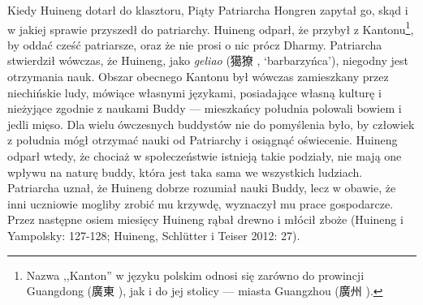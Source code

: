 Kiedy Huineng dotarł do klasztoru, Piąty Patriarcha Hongren zapytał go, skąd i w jakiej sprawie przyszedł do patriarchy.
Huineng odparł, że przybył z Kantonu\footnote{Nazwa ,,Kanton'' w języku polskim odnosi się zarówno do prowincji Guangdong (廣東 ), jak i do jej stolicy --- miasta Guangzhou (廣州 ).}, by oddać cześć patriarsze, oraz że nie prosi o nic prócz Dharmy.
Patriarcha stwierdził wówczas, że Huineng, jako \textit{geliao} (獦獠 , `barbarzyńca'), niegodny jest otrzymania nauk.
Obszar obecnego Kantonu był wówczas zamieszkany przez niechińskie ludy, mówiące własnymi językami, posiadające własną kulturę i nieżyjące zgodnie z naukami Buddy --- mieszkańcy południa polowali bowiem i jedli mięso.
Dla wielu ówczesnych buddystów nie do pomyślenia było, by człowiek z południa mógł otrzymać nauki od Patriarchy i osiągnąć oświecenie.
Huineng odparł wtedy, że chociaż w społeczeństwie istnieją takie podziały, nie mają one wpływu na naturę buddy, która jest taka sama we wszystkich ludziach.
Patriarcha uznał, że Huineng dobrze rozumiał nauki Buddy, lecz w obawie, że inni uczniowie mogliby zrobić mu krzywdę, wyznaczył mu prace gospodarcze.
Przez następne osiem miesięcy Huineng rąbał drewno i młócił zboże
(Huineng i Yampolsky: 127-128; Huineng, Schlütter i Teiser 2012: 27).

